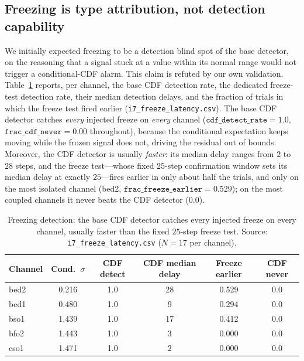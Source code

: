 \subsection{Freezing is type attribution, not detection capability}
\label{sec:freeze}
We initially expected freezing to be a detection blind spot of the base detector, on the reasoning that a signal stuck at a value within its normal range would not trigger a conditional-CDF alarm. This claim is refuted by our own validation. Table~\ref{tab:freeze} reports, per channel, the base CDF detection rate, the dedicated freeze-test detection rate, their median detection delays, and the fraction of trials in which the freeze test fired earlier (\texttt{i7\_freeze\_latency.csv}). The base CDF detector catches \emph{every} injected freeze on \emph{every} channel ($\texttt{cdf\_detect\_rate}=1.0$, $\texttt{frac\_cdf\_never}=0.00$ throughout), because the conditional expectation keeps moving while the frozen signal does not, driving the residual out of bounds. Moreover, the CDF detector is usually \emph{faster}: its median delay ranges from $2$ to $28$ steps, and the freeze test---whose fixed $25$-step confirmation window sets its median delay at exactly $25$---fires earlier in only about half the trials, and only on the most isolated channel (bed2, $\texttt{frac\_freeze\_earlier}=0.529$); on the most coupled channels it never beats the CDF detector ($0.0$).

\begin{table}[t]
    \centering
    \caption{Freezing detection: the base CDF detector catches every injected freeze on every channel, usually faster than the fixed $25$-step freeze test. Source: \texttt{i7\_freeze\_latency.csv} ($N=17$ per channel).}
    \label{tab:freeze}
    \begin{tabular}{lccccc}
        \toprule
        Channel & Cond.\ $\sigma$ & CDF detect & CDF median delay & Freeze earlier & CDF never \\
        \midrule
        bed2 & 0.216 & 1.0 & 28 & 0.529 & 0.0 \\
        bed1 & 0.480 & 1.0 & 9  & 0.294 & 0.0 \\
        bso1 & 1.439 & 1.0 & 17 & 0.412 & 0.0 \\
        bfo2 & 1.443 & 1.0 & 3  & 0.000 & 0.0 \\
        cso1 & 1.471 & 1.0 & 2  & 0.000 & 0.0 \\
        \bottomrule
    \end{tabular}
\end{table}


